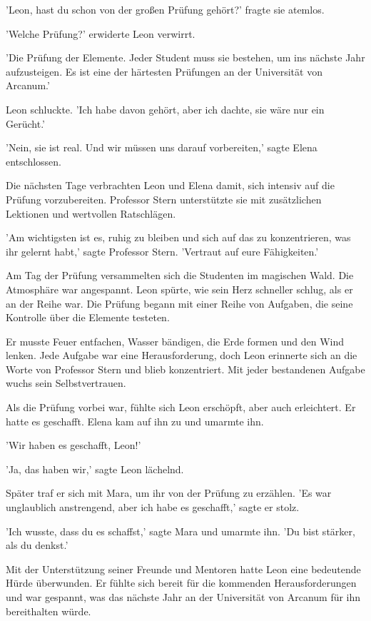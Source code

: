 \documentclass[12pt]{article}
\begin{document}
'Leon, hast du schon von der großen Prüfung gehört?' fragte sie atemlos.

'Welche Prüfung?' erwiderte Leon verwirrt.

'Die Prüfung der Elemente. Jeder Student muss sie bestehen, um ins nächste Jahr aufzusteigen. Es ist eine der härtesten Prüfungen an der Universität von Arcanum.'

Leon schluckte. 'Ich habe davon gehört, aber ich dachte, sie wäre nur ein Gerücht.'

'Nein, sie ist real. Und wir müssen uns darauf vorbereiten,' sagte Elena entschlossen.

Die nächsten Tage verbrachten Leon und Elena damit, sich intensiv auf die Prüfung vorzubereiten. Professor Stern unterstützte sie mit zusätzlichen Lektionen und wertvollen Ratschlägen.

'Am wichtigsten ist es, ruhig zu bleiben und sich auf das zu konzentrieren, was ihr gelernt habt,' sagte Professor Stern. 'Vertraut auf eure Fähigkeiten.'

Am Tag der Prüfung versammelten sich die Studenten im magischen Wald. Die Atmosphäre war angespannt. Leon spürte, wie sein Herz schneller schlug, als er an der Reihe war. Die Prüfung begann mit einer Reihe von Aufgaben, die seine Kontrolle über die Elemente testeten.

Er musste Feuer entfachen, Wasser bändigen, die Erde formen und den Wind lenken. Jede Aufgabe war eine Herausforderung, doch Leon erinnerte sich an die Worte von Professor Stern und blieb konzentriert. Mit jeder bestandenen Aufgabe wuchs sein Selbstvertrauen.

Als die Prüfung vorbei war, fühlte sich Leon erschöpft, aber auch erleichtert. Er hatte es geschafft. Elena kam auf ihn zu und umarmte ihn.

'Wir haben es geschafft, Leon!'

'Ja, das haben wir,' sagte Leon lächelnd.

Später traf er sich mit Mara, um ihr von der Prüfung zu erzählen. 'Es war unglaublich anstrengend, aber ich habe es geschafft,' sagte er stolz.

'Ich wusste, dass du es schaffst,' sagte Mara und umarmte ihn. 'Du bist stärker, als du denkst.'

Mit der Unterstützung seiner Freunde und Mentoren hatte Leon eine bedeutende Hürde überwunden. Er fühlte sich bereit für die kommenden Herausforderungen und war gespannt, was das nächste Jahr an der Universität von Arcanum für ihn bereithalten würde.
\end{document}

